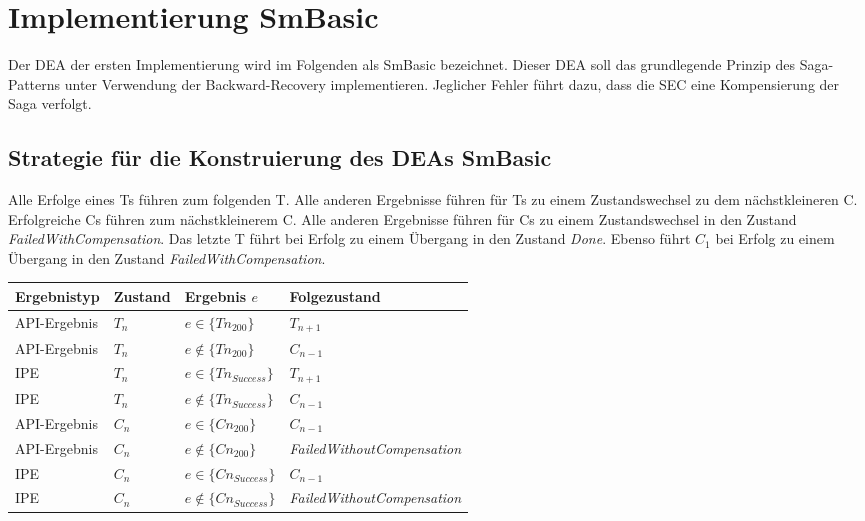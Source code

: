 \section{Implementierung SmBasic}

Der DEA der ersten Implementierung wird im Folgenden als SmBasic bezeichnet. Dieser DEA soll das grundlegende Prinzip des Saga-Patterns unter Verwendung der Backward-Recovery implementieren. Jeglicher Fehler führt dazu, dass die SEC eine Kompensierung der Saga verfolgt.

\subsection{Strategie für die Konstruierung des DEAs SmBasic}

Alle Erfolge eines Ts führen zum folgenden T. Alle anderen Ergebnisse führen für Ts zu einem Zustandswechsel zu dem nächstkleineren C. Erfolgreiche Cs führen zum nächstkleinerem C. Alle anderen Ergebnisse führen für Cs zu einem Zustandswechsel in den Zustand \textit{FailedWithCompensation}. Das letzte T führt bei Erfolg zu einem Übergang in den Zustand \textit{Done}. Ebenso führt $C_1$ bei Erfolg zu einem Übergang in den Zustand \textit{FailedWithCompensation}. 

\begin{center}
	\begin{longtable}[h]{|p{2.6cm}|p{2cm}|p{2.8cm}|p{5cm}|}
		\hline
		Ergebnistyp & Zustand & Ergebnis $e$& Folgezustand \\ \hline
		API-Ergebnis & $T_n$ & $e \in \{Tn_{200}\}$ & $T_{n+1}$ \\ \hline
		API-Ergebnis & $T_n$ & $e \not\in \{Tn_{200}\}$ & $C_{n-1}$ \\ \hline
		IPE & $T_n$ & $e \in \{Tn_{Success}\}$ & $T_{n+1}$\\ \hline
		IPE & $T_n$ & $e \not\in \{Tn_{Success}\}$ & $C_{n-1}$\\ \hline
		API-Ergebnis & $C_n$ & $e \in \{Cn_{200}\}$ & $C_{n-1}$ \\ \hline
		API-Ergebnis & $C_n$ & $e \not\in \{Cn_{200}\}$ & \textit{FailedWithoutCompensation} \\ \hline
		IPE & $C_n$ & $e \in \{Cn_{Success}\}$ & $C_{n-1}$\\ \hline
		IPE & $C_n$ & $e \not\in \{Cn_{Success}\}$ & \textit{FailedWithoutCompensation}\\ \hline
	\end{longtable}
\end{center}
\FloatBarrier

